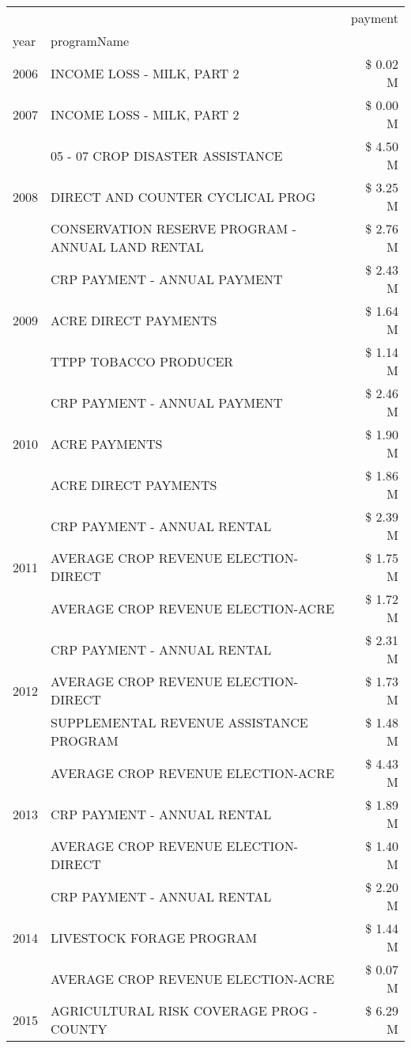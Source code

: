 \begin{tabular}{llr}
\toprule
 &  & payment \\
year & programName &  \\
\midrule
2006 & INCOME LOSS - MILK, PART 2 & \$ 0.02 M \\
\cline{1-3}
2007 & INCOME LOSS - MILK, PART 2 & \$ 0.00 M \\
\cline{1-3}
\multirow[t]{3}{*}{2008} & 05 - 07 CROP DISASTER ASSISTANCE & \$ 4.50 M \\
 & DIRECT AND COUNTER CYCLICAL PROG & \$ 3.25 M \\
 & CONSERVATION RESERVE PROGRAM - ANNUAL LAND RENTAL & \$ 2.76 M \\
\cline{1-3}
\multirow[t]{3}{*}{2009} & CRP PAYMENT - ANNUAL PAYMENT & \$ 2.43 M \\
 & ACRE DIRECT PAYMENTS & \$ 1.64 M \\
 & TTPP TOBACCO PRODUCER & \$ 1.14 M \\
\cline{1-3}
\multirow[t]{3}{*}{2010} & CRP PAYMENT - ANNUAL PAYMENT & \$ 2.46 M \\
 & ACRE PAYMENTS & \$ 1.90 M \\
 & ACRE DIRECT PAYMENTS & \$ 1.86 M \\
\cline{1-3}
\multirow[t]{3}{*}{2011} & CRP PAYMENT - ANNUAL RENTAL & \$ 2.39 M \\
 & AVERAGE CROP REVENUE ELECTION-DIRECT & \$ 1.75 M \\
 & AVERAGE CROP REVENUE ELECTION-ACRE & \$ 1.72 M \\
\cline{1-3}
\multirow[t]{3}{*}{2012} & CRP PAYMENT - ANNUAL RENTAL & \$ 2.31 M \\
 & AVERAGE CROP REVENUE ELECTION-DIRECT & \$ 1.73 M \\
 & SUPPLEMENTAL REVENUE ASSISTANCE PROGRAM & \$ 1.48 M \\
\cline{1-3}
\multirow[t]{3}{*}{2013} & AVERAGE CROP REVENUE ELECTION-ACRE & \$ 4.43 M \\
 & CRP PAYMENT - ANNUAL RENTAL & \$ 1.89 M \\
 & AVERAGE CROP REVENUE ELECTION-DIRECT & \$ 1.40 M \\
\cline{1-3}
\multirow[t]{3}{*}{2014} & CRP PAYMENT - ANNUAL RENTAL & \$ 2.20 M \\
 & LIVESTOCK FORAGE PROGRAM & \$ 1.44 M \\
 & AVERAGE CROP REVENUE ELECTION-ACRE & \$ 0.07 M \\
\cline{1-3}
\multirow[t]{3}{*}{2015} & AGRICULTURAL RISK COVERAGE PROG - COUNTY & \$ 6.29 M \\

\end{tabular}
